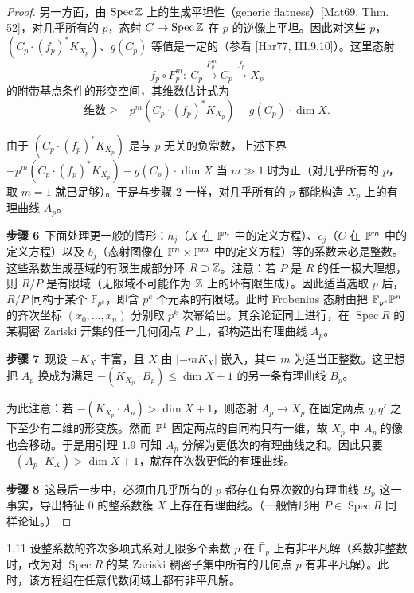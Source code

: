 \begin{proof}
另一方面，由 $\operatorname{Spec}\mathbb{Z}$ 上的生成平坦性（generic flatness）[Mat69, Thm. 52]，对几乎所有的 $p$，态射 $C\to\operatorname{Spec}\mathbb{Z}$ 在 $p$ 的逆像上平坦。因此对这些 $p$，$(C_p\cdot(f_p)^*K_{X_p})$、$g(C_p)$ 等值是一定的（参看 [Har77, III.9.10]）。这里态射
\[ f_p\circ F_p^m:\ C_p\xrightarrow{F_p^m}C_p\xrightarrow{f_p}X_p \]
的附带基点条件的形变空间，其维数估计式为
\[ \text{维数}\ge -p^m(C_p\cdot(f_p)^*K_{X_p})-g(C_p)\cdot\dim X. \]

由于 $(C_p\cdot(f_p)^*K_{X_p})$ 是与 $p$ 无关的负常数，上述下界 $-p^m(C_p\cdot(f_p)^*K_{X_p})-g(C_p)\cdot\dim X$ 当 $m\gg 1$ 时为正（对几乎所有的 $p$，取 $m=1$ 就已足够）。于是与步骤 2 一样，对几乎所有的 $p$ 都能构造 $X_p$ 上的有理曲线 $A_p$。

\textbf{步骤 6}\ 下面处理更一般的情形：$h_j$（$X$ 在 $\mathbb{P}^n$ 中的定义方程）、$c_j$（$C$ 在 $\mathbb{P}^m$ 中的定义方程）以及 $b_j$（态射图像在 $\mathbb{P}^n\times\mathbb{P}^m$ 中的定义方程）等的系数未必是整数。这些系数生成基域的有限生成部分环 $R\supset\mathbb{Z}$。注意：若 $P$ 是 $R$ 的任一极大理想，则 $R/P$ 是有限域（无限域不可能作为 $\mathbb{Z}$ 上的环有限生成）。因此适当选取 $p$ 后，$R/P$ 同构于某个 $\mathbb{F}_{p^k}$，即含 $p^k$ 个元素的有限域。此时 Frobenius 态射由把 $\mathbb{F}_{p^k}\mathbb{P}^n$ 的齐次坐标 $(x_0,\dots,x_n)$ 分别取 $p^k$ 次幂给出。其余论证同上进行，在 $\operatorname{Spec}R$ 的某稠密 Zariski 开集的任一几何闭点 $P$ 上，都构造出有理曲线 $A_p$。

\textbf{步骤 7}\ 现设 $-K_X$ 丰富，且 $X$ 由 $|-mK_X|$ 嵌入，其中 $m$ 为适当正整数。这里想把 $A_p$ 换成为满足 $-(K_{X_p}\cdot B_p)\le\dim X+1$ 的另一条有理曲线 $B_p$。

为此注意：若 $-(K_{X_p}\cdot A_p)>\dim X+1$，则态射 $A_p\to X_p$ 在固定两点 $q,q'$ 之下至少有二维的形变族。然而 $\mathbb{P}^1$ 固定两点的自同构只有一维，故 $X_p$ 中 $A_p$ 的像也会移动。于是用引理 1.9 可知 $A_p$ 分解为更低次的有理曲线之和。因此只要 $-(A_p\cdot K_X)>\dim X+1$，就存在次数更低的有理曲线。

\textbf{步骤 8}\ 这最后一步中，必须由几乎所有的 $p$ 都存在有界次数的有理曲线 $B_p$ 这一事实，导出特征 0 的整系数簇 $X$ 上存在有理曲线。（一般情形用 $P\in\operatorname{Spec}R$ 同样论证。）
\end{proof}

\begin{principlep}{1.11}
设整系数的齐次多项式系对无限多个素数 $p$ 在 $\bar{\mathbb{F}}_p$ 上有非平凡解（系数非整数时，改为对 $\operatorname{Spec}R$ 的某 Zariski 稠密子集中所有的几何点 $p$ 有非平凡解）。此时，该方程组在任意代数闭域上都有非平凡解。
\end{principlep}
